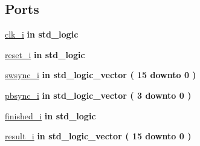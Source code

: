 \subsection*{Ports}
 \begin{DoxyCompactItemize}
\item 
\hyperlink{classcalc__ctrl_abe949478e3f8aad0a6aeb1842fa6c608}{clk\+\_\+i}  {\bfseries {\bfseries \textcolor{keywordflow}{in}\textcolor{vhdlchar}{ }}} {\bfseries \textcolor{comment}{std\+\_\+logic}\textcolor{vhdlchar}{ }} 
\item 
\hyperlink{classcalc__ctrl_a55da7e76960757f8c6842e86a28ee7be}{reset\+\_\+i}  {\bfseries {\bfseries \textcolor{keywordflow}{in}\textcolor{vhdlchar}{ }}} {\bfseries \textcolor{comment}{std\+\_\+logic}\textcolor{vhdlchar}{ }} 
\item 
\hyperlink{classcalc__ctrl_a8f274a58bd077b3f0604e897f5fd8d06}{swsync\+\_\+i}  {\bfseries {\bfseries \textcolor{keywordflow}{in}\textcolor{vhdlchar}{ }}} {\bfseries \textcolor{comment}{std\+\_\+logic\+\_\+vector}\textcolor{vhdlchar}{ }\textcolor{vhdlchar}{(}\textcolor{vhdlchar}{ }\textcolor{vhdlchar}{ } \textcolor{vhdldigit}{15} \textcolor{vhdlchar}{ }\textcolor{keywordflow}{downto}\textcolor{vhdlchar}{ }\textcolor{vhdlchar}{ } \textcolor{vhdldigit}{0} \textcolor{vhdlchar}{ }\textcolor{vhdlchar}{)}\textcolor{vhdlchar}{ }} 
\item 
\hyperlink{classcalc__ctrl_ac9ed06cffb254d885992bb8fb780e8e6}{pbsync\+\_\+i}  {\bfseries {\bfseries \textcolor{keywordflow}{in}\textcolor{vhdlchar}{ }}} {\bfseries \textcolor{comment}{std\+\_\+logic\+\_\+vector}\textcolor{vhdlchar}{ }\textcolor{vhdlchar}{(}\textcolor{vhdlchar}{ }\textcolor{vhdlchar}{ } \textcolor{vhdldigit}{3} \textcolor{vhdlchar}{ }\textcolor{keywordflow}{downto}\textcolor{vhdlchar}{ }\textcolor{vhdlchar}{ } \textcolor{vhdldigit}{0} \textcolor{vhdlchar}{ }\textcolor{vhdlchar}{)}\textcolor{vhdlchar}{ }} 
\item 
\hyperlink{classcalc__ctrl_acaa48c495703015d6cbb2b40c0fd2e9b}{finished\+\_\+i}  {\bfseries {\bfseries \textcolor{keywordflow}{in}\textcolor{vhdlchar}{ }}} {\bfseries \textcolor{comment}{std\+\_\+logic}\textcolor{vhdlchar}{ }} 
\item 
\hyperlink{classcalc__ctrl_a58aeef44e9161ee5cb7cc149ac8ee71a}{result\+\_\+i}  {\bfseries {\bfseries \textcolor{keywordflow}{in}\textcolor{vhdlchar}{ }}} {\bfseries \textcolor{comment}{std\+\_\+logic\+\_\+vector}\textcolor{vhdlchar}{ }\textcolor{vhdlchar}{(}\textcolor{vhdlchar}{ }\textcolor{vhdlchar}{ } \textcolor{vhdldigit}{15} \textcolor{vhdlchar}{ }\textcolor{keywordflow}{downto}\textcolor{vhdlchar}{ }\textcolor{vhdlchar}{ } \textcolor{vhdldigit}{0} \textcolor{vhdlchar}{ }\textcolor{vhdlchar}{)}\textcolor{vhdlchar}{ }} 

\end{DoxyCompactItemize}

